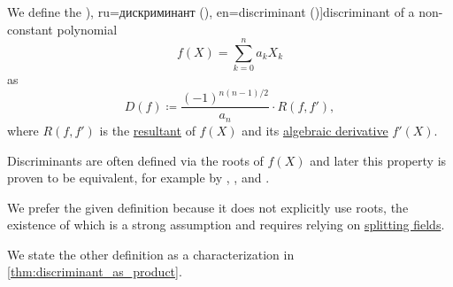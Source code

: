 \begin{definition}\label{def:discriminant}
  We define the \term[bg=дискриминанта (\cite[215]{Обрешков1962ВисшаАлгебра}), ru=дискриминант (\cite[141]{Винберг2014КурсАлгебры}), en=discriminant (\cite[223]{Rotman2015AdvancedModernAlgebraPart1})]{discriminant} of a non-constant polynomial
  \begin{equation*}
    f(X) = \sum_{k=0}^n a_k X_k
  \end{equation*}
  as
  \begin{equation*}
    D(f) \coloneqq \frac {(-1)^{n(n-1)/2}} {a_n} \cdot R(f, f'),
  \end{equation*}
  where \( R(f, f') \) is the \hyperref[def:resultant]{resultant} of \( f(X) \) and its \hyperref[def:algebraic_derivative]{algebraic derivative} \( f'(X) \).
\end{definition}
\begin{comments}
  \item Discriminants are often defined via the roots of \( f(X) \) and later this property is proven to be equivalent, for example by
  ,
  ,
   and
  .

  We prefer the given definition because it does not explicitly use roots, the existence of which is a strong assumption and requires relying on \hyperref[def:splitting_field]{splitting fields}.

  We state the other definition as a characterization in \cref{thm:discriminant_as_product}.
\end{comments}

